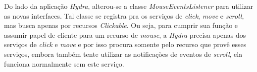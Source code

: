 Do lado da aplicação \emph{Hydra}, alterou-se a classe \emph{MouseEventsListener} para utilizar as novas interfaces. Tal classe se registra pra os serviços de \emph{click}, \emph{move} e \emph{scroll}, mas busca apenas por recursos \emph{Clickable}. Ou seja, para cumprir sua função e assumir papel de cliente para um recurso de \emph{mouse}, a \emph{Hydra} precisa apenas dos serviços de \emph{click} e \emph{move} e por isso procura somente pelo recurso que provê esses serviços, embora também tente utilizar as notificaçòes de eventos de \emph{scroll}, ela funciona normalmente sem este serviço.
 
